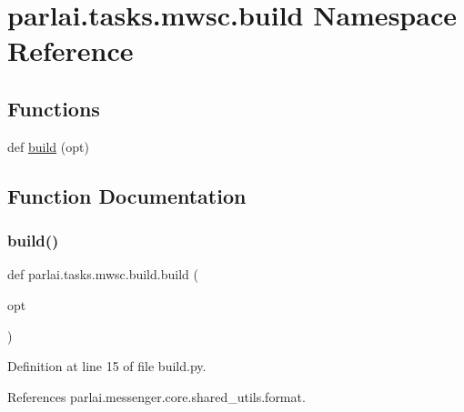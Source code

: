 \hypertarget{namespaceparlai_1_1tasks_1_1mwsc_1_1build}{}\section{parlai.\+tasks.\+mwsc.\+build Namespace Reference}
\label{namespaceparlai_1_1tasks_1_1mwsc_1_1build}
\subsection*{Functions}
\begin{DoxyCompactItemize}
\item 
def \hyperlink{namespaceparlai_1_1tasks_1_1mwsc_1_1build_a21fb0afba67df57037a48b4250337077}{build} (opt)
\end{DoxyCompactItemize}


\subsection{Function Documentation}
\mbox{\label{namespaceparlai_1_1tasks_1_1mwsc_1_1build_a21fb0afba67df57037a48b4250337077}} 
\subsubsection{\texorpdfstring{build()}{build()}}
{\footnotesize\ttfamily def parlai.\+tasks.\+mwsc.\+build.\+build (\begin{DoxyParamCaption}\item[{}]{opt }\end{DoxyParamCaption})}



Definition at line 15 of file build.\+py.



References parlai.\+messenger.\+core.\+shared\+\_\+utils.\+format.

